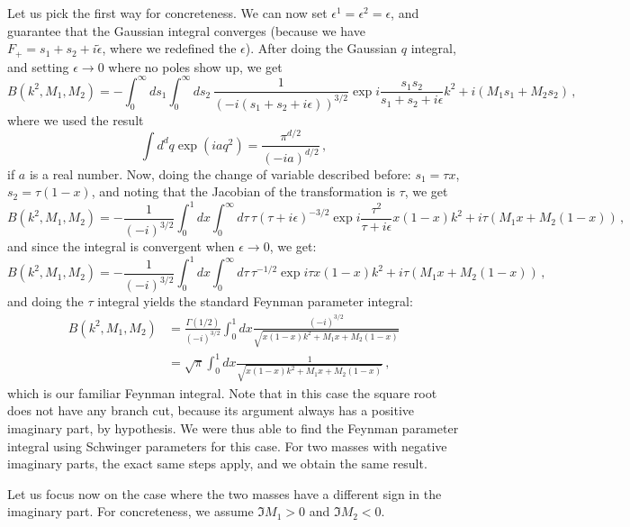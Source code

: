 \documentclass[twoside]{article}
\begin{document}
Let us pick the first way for concreteness.
We can now set $\epsilon^1=\epsilon^2=\epsilon$, and guarantee that the Gaussian integral converges (because we have $F_+ = s_1 + s_2 + i \tilde{\epsilon}$, where we redefined the $\epsilon$).
After doing the Gaussian $q$ integral, and setting $\epsilon \to 0$ where no poles show up, we get
\begin{equation}
B(k^2,M_1,M_2)= - \int_0^\infty ds_1 \int_0^\infty ds_2\,\frac{1}{(- i(s_1+s_2+ i \epsilon))^{3/2}} \exp{i\frac{s_1 s_2}{s_1+s_2+i\epsilon}k^2+ i (M_1 s_1 +M_2 s_2)}\,,
\end{equation}
where we used the result
\begin{equation}
\label{eq:gauss}
\int d^d q \exp(i a q^2) = \frac{\pi^{d/2}}{(-i a)^{d/2}}\,,
\end{equation}
if $a$ is a real number.
Now, doing the change of variable described before: $s_1 = \tau x$, $s_2 = \tau (1-x)$, and noting that the Jacobian of the transformation is $\tau$, we get
\begin{equation}
B(k^2,M_1,M_2)= - \frac{1}{(- i)^{3/2}} \int_0^1 dx \int_0^\infty d\tau\, \tau (\tau+i \epsilon)^{-3/2}  \exp{i \frac{\tau^2}{\tau+i \epsilon} x (1-x)k^2+ i \tau (M_1 x +M_2 (1-x))}\,,
\end{equation}
and since the integral is convergent when $\epsilon \to 0$, we get:
\begin{equation}
B(k^2,M_1,M_2)= - \frac{1}{(- i)^{3/2}} \int_0^1 dx \int_0^\infty d\tau\, \tau^{-1/2}  \exp{i \tau x (1-x)k^2+ i \tau (M_1 x +M_2 (1-x))}\,,
\end{equation}
and doing the $\tau$ integral yields the standard Feynman parameter integral:
\begin{align}
B(k^2,M_1,M_2)&= \frac{\Gamma(1/2)}{(- i)^{3/2}} \int_0^1 dx \frac{(-i)^{3/2}}{\sqrt{x (1-x)k^2+ M_1 x +M_2 (1-x)}}\\
& = \sqrt{\pi}\int_0^1 dx \frac{1}{\sqrt{x (1-x)k^2+ M_1 x +M_2 (1-x)}} \,,
\end{align}
which is our familiar Feynman integral.  
Note that in this case the square root does not have any branch cut, because its argument always has a positive imaginary part, by hypothesis. We were thus able to find the Feynman parameter integral using Schwinger parameters for this case. For two masses with negative imaginary parts, the exact same steps apply, and we obtain the same result.

Let us focus now on the case where the two masses have a different sign in the imaginary part. For concreteness, we assume $\Im M_1 > 0$ and $\Im M_2 < 0$.
\end{document}
